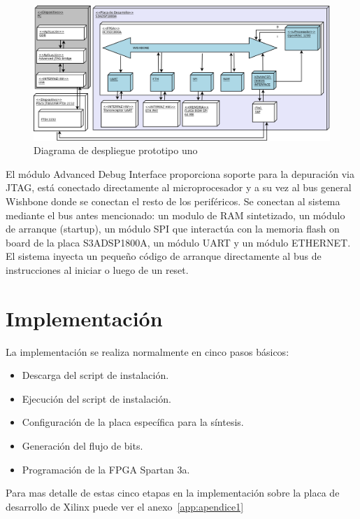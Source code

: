 		\begin{figure}[!h]
 		\begin{center}
  		\includegraphics[width=1\textwidth,keepaspectratio=true]{./images/proto1}
  		\caption{Diagrama de despliegue prototipo uno}
  		\label{fig:minsoc}
 		\end{center}
		\end{figure}
		
		El módulo Advanced Debug Interface proporciona soporte para la depuración via JTAG, está conectado directamente al microprocesador y a su vez al bus
		general Wishbone donde se conectan el resto de los periféricos. Se conectan al sistema mediante el bus antes mencionado: un modulo de RAM
		sintetizado, un módulo de arranque (startup), un módulo SPI que interactúa con la memoria flash on board de la placa S3ADSP1800A, un módulo UART y
		un módulo ETHERNET. El sistema inyecta un pequeño código de arranque directamente al bus de instrucciones al iniciar o luego de un reset. 


			
		\section{Implementación}

La implementación se realiza normalmente en cinco pasos básicos: 
\begin {itemize}
\item Descarga del script de instalación.
\item Ejecución del script de instalación.
\item Configuración de la placa específica para la síntesis.
\item Generación del flujo de bits.
\item Programación de la FPGA Spartan 3a.
 \end {itemize}
Para mas detalle de estas cinco etapas en la implementación sobre la placa de desarrollo  de Xilinx puede ver el anexo~\ref{app:apendice1}

